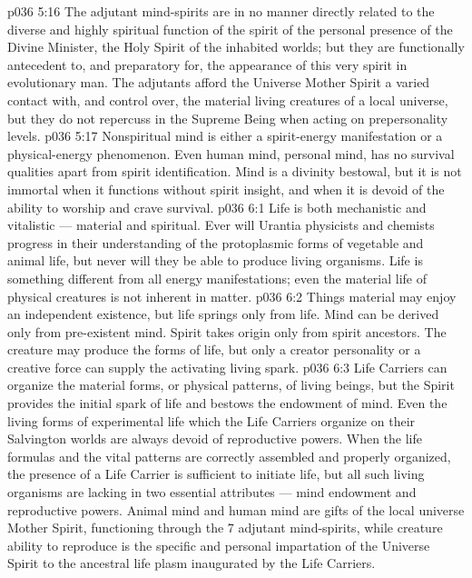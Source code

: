 \vs p036 5:16 The adjutant mind\hyp{}spirits are in no manner directly related to the diverse and highly spiritual function of the spirit of the personal presence of the Divine Minister, the Holy Spirit of the inhabited worlds; but they are functionally antecedent to, and preparatory for, the appearance of this very spirit in evolutionary man. The adjutants afford the Universe Mother Spirit a varied contact with, and control over, the material living creatures of a local universe, but they do not repercuss in the Supreme Being when acting on prepersonality levels.
\vs p036 5:17 \pc Nonspiritual mind is either a spirit\hyp{}energy manifestation or a physical\hyp{}energy phenomenon. Even human mind, personal mind, has no survival qualities apart from spirit identification. Mind is a divinity bestowal, but it is not immortal when it functions without spirit insight, and when it is devoid of the ability to worship and crave survival.
\vs p036 6:1 Life is both mechanistic and vitalistic --- material and spiritual. Ever will Urantia physicists and chemists progress in their understanding of the protoplasmic forms of vegetable and animal life, but never will they be able to produce living organisms. Life is something different from all energy manifestations; even the material life of physical creatures is not inherent in matter.
\vs p036 6:2 Things material may enjoy an independent existence, but life springs only from life. Mind can be derived only from pre\hyp{}existent mind. Spirit takes origin only from spirit ancestors. The creature may produce the forms of life, but only a creator personality or a creative force can supply the activating living spark.
\vs p036 6:3 Life Carriers can organize the material forms, or physical patterns, of living beings, but the Spirit provides the initial spark of life and bestows the endowment of mind. Even the living forms of experimental life which the Life Carriers organize on their Salvington worlds are always devoid of reproductive powers. When the life formulas and the vital patterns are correctly assembled and properly organized, the presence of a Life Carrier is sufficient to initiate life, but all such living organisms are lacking in two essential attributes --- mind endowment and reproductive powers. Animal mind and human mind are gifts of the local universe Mother Spirit, functioning through the 7 adjutant mind\hyp{}spirits, while creature ability to reproduce is the specific and personal impartation of the Universe Spirit to the ancestral life plasm inaugurated by the Life Carriers.
